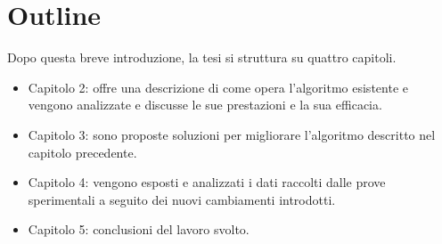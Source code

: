 \section{Outline}
	Dopo questa breve introduzione, la tesi si struttura su quattro capitoli.
	\begin{itemize}
		\item Capitolo 2: offre una descrizione di come opera l'algoritmo esistente e vengono analizzate e discusse le sue prestazioni e la sua efficacia.
		\item Capitolo 3: sono proposte soluzioni per migliorare l'algoritmo descritto nel capitolo precedente.
		\item Capitolo 4: vengono esposti e analizzati i dati raccolti dalle prove sperimentali a seguito dei nuovi cambiamenti introdotti.
		\item Capitolo 5: conclusioni del lavoro svolto.
	\end{itemize}
	
















